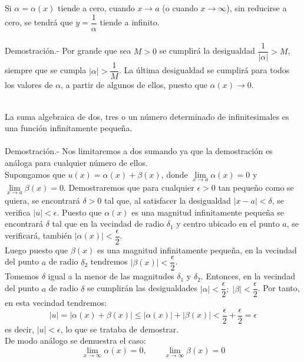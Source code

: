     \begin{teo}
	Si $\alpha = \alpha(x)$ tiende a cero, cuando ${x \to a}$ (o cuando ${x \to \infty}$), sin reducirse a cero, se tendrá que $y=\dfrac{1}{\alpha}$  tiende a infinito.\\\\
	    Demostración.-\; Por grande que sea $M>0$ se cumplirá la desigualdad $\dfrac{1}{|\alpha|}>M$, siempre que se cumpla $|\alpha|>\dfrac{1}{M}$. La última desigualdad se cumplirá para todos los valores de $\alpha$, a partir de algunos de ellos, puesto que $\alpha(x) \to 0.$\\\\
    \end{teo}

    \begin{teo}
	La suma algebraica de dos, tres o un número determinado de infinitesimales es una función infinitamente pequeña.\\\\
	    Demostración.-\; Nos limitaremos a dos sumando ya que la demostración es análoga para cualquier número de ellos.\\
	    Supongamos que $u(x)=\alpha(x) + \beta(x)$, donde $\lim\limits_{x \to a} \alpha(x)=0$ y $\lim\limits_{x \to a} \beta(x)=0$. Demostraremos que para cualquier $\epsilon >0$ tan pequeño como se quiera, se encontrará $\delta >0$ tal que, al satisfacer la desigualdad $|x-a|<\delta$, se verifica $|u|<\epsilon$. Puesto que $\alpha (x)$ es una magnitud infinitamente pequeña se encontrará $\delta$ tal que en la vecindad de radio $\delta_1$ y centro ubicado en el punto $a$, se verificará, también $|\alpha(x)|<\dfrac{\epsilon}{2}$.\\
	    Luego puesto que $\beta (x)$ es una magnitud infinitamente pequeña, en la vecindad del punto $a$ de radio $\delta_2$ tendremos $|\beta(x)|<\dfrac{\epsilon}{2}$.\\
	    Tomemos $\delta$ igual a la menor de las magnitudes $\delta_1$ y $\delta_2$. Entonces, en la vecindad del punto $a$ de radio $\delta$ se cumplirán las desigualdades $|\alpha|<\dfrac{\epsilon}{2}; \; |\beta|<\dfrac{\epsilon}{2}$. Por tanto, en esta vecindad tendremos: $$|u|=|\alpha (x) + \beta (x)|\leq |\alpha (x)| + |\beta (x)| < \dfrac{\epsilon}{2} + \dfrac{\epsilon}{2} = \epsilon$$ es decir, $|u|<\epsilon$, lo que se trataba de demostrar.\\
	    De modo análogo se demuestra el caso: $$\lim\limits_{x \to \infty} \alpha (x)=0, \qquad \lim\limits_{x \to \infty} \beta (x) =0$$\\\\
    \end{teo}


